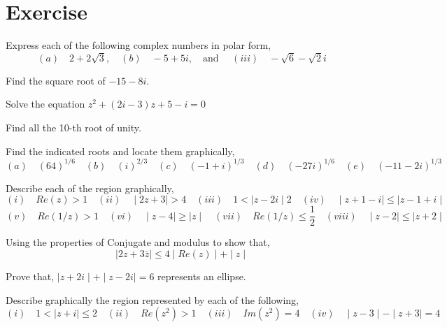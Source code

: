 \section{Exercise}
\begin{exercise}
    Express each of the following complex numbers in polar form, 
    $$(a)\quad  2+2\sqrt{3},\quad (b)\quad -5+5i, \quad \text{and }\quad  (iii)\quad -\sqrt{6}-\sqrt{2}i$$
\end{exercise}
\begin{exercise}
    Find the square root of $-15-8i$. 
\end{exercise}
\begin{exercise}
    Solve the equation $\displaystyle z^2+(2i-3)z+5-i=0$
\end{exercise}
\begin{exercise}
    Find all the 10-th root of unity. 
\end{exercise}
\begin{exercise}
    Find the indicated roots and locate them graphically, 
    $$(a) \quad (64)^{1/6}\quad (b) \quad (i)^{2/3} \quad (c)\quad (-1+i)^{1/3} \quad (d) \quad (-27i)^{1/6} \quad (e) \quad (-11-2i)^{1/3}$$
\end{exercise}
\begin{exercise}
    Describe each of the region graphically, 
    $$(i)\quad Re(z)>1 \quad (ii)\quad \mid 2z+3 \mid >4 \quad (iii) \quad 1< \mid z-2i \mid 2 \quad (iv) \quad \mid z+1-i \mid \leq \mid z-1+i \mid $$
    $$(v) \quad Re(1/z)>1 \quad (vi) \quad \mid z-4 \mid \geq \mid z \mid \quad (vii) \quad Re(1/z)\leq \frac{1}{2} \quad (viii) \quad \mid z-2 \mid \leq \mid z+2 \mid$$
\end{exercise}
\begin{exercise}
    Using the properties of Conjugate and modulus to show that, $$\mid 2z+3\bar{z}\mid \leq 4 \mid Re(z) \mid +\mid z\mid$$
\end{exercise}
\begin{exercise}
    Prove that, $\mid z+2i \mid + \mid z-2i \mid =6$  represents an ellipse.
\end{exercise}
\begin{exercise}
    Describe graphically the region represented by each of the following, 
    $$(i) \quad 1<\mid z+i \mid \leq 2 \quad (ii) \quad Re(z^2)>1 \quad (iii) \quad Im(z^2)=4 \quad (iv) \quad \mid z-3 \mid - \mid z+3 \mid =4$$
\end{exercise}
